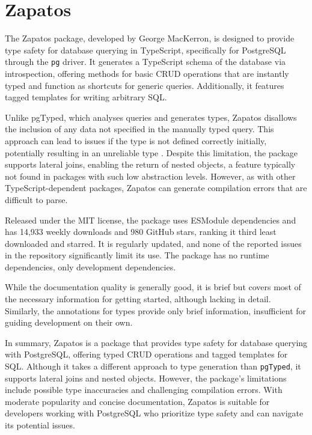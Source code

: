 \section{Zapatos}
The Zapatos package, developed by George MacKerron, is designed to provide type
safety for database querying in TypeScript, specifically for PostgreSQL through
the \texttt{pg} driver. It generates a TypeScript schema of the database via
introspection, offering methods for basic CRUD operations that are instantly
typed and function as shortcuts for generic queries. Additionally, it features
tagged templates for writing arbitrary SQL.

Unlike pgTyped, which analyses queries and generates types, Zapatos disallows
the inclusion of any data not specified in the manually typed query. This
approach can lead to issues if the type is not defined correctly initially,
potentially resulting in an unreliable type . Despite this limitation, the package supports
lateral joins, enabling the return of nested objects, a feature typically not
found in packages with such low abstraction levels. However, as with other
TypeScript-dependent packages, Zapatos can generate compilation errors that are
difficult to parse.

Released under the MIT license, the package uses ESModule dependencies and has
14,933 weekly downloads and 980 GitHub stars, ranking it third least downloaded
and starred. It is regularly updated, and none of the reported issues in the
repository significantly limit its use. The package has no runtime dependencies,
only development dependencies.

While the documentation quality is generally good, it is brief but covers most
of the necessary information for getting started, although lacking in detail.
Similarly, the annotations for types provide only brief information,
insufficient for guiding development on their own.

In summary, Zapatos is a package that provides type safety for database querying
with PostgreSQL, offering typed CRUD operations and tagged templates for SQL.
Although it takes a different approach to type generation than \texttt{pgTyped},
it supports lateral joins and nested objects. However, the package's limitations
include possible type inaccuracies and challenging compilation errors. With
moderate popularity and concise documentation, Zapatos is suitable for
developers working with PostgreSQL who prioritize type safety and can navigate
its potential issues.